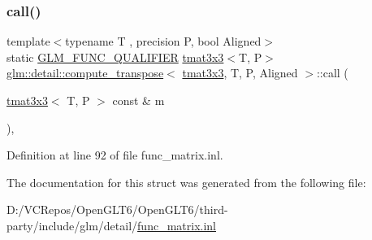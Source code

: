 \subsubsection{\texorpdfstring{call()}{call()}}
{\footnotesize\ttfamily template$<$typename T , precision P, bool Aligned$>$ \\
static \mbox{\hyperlink{setup_8hpp_a33fdea6f91c5f834105f7415e2a64407}{G\+L\+M\+\_\+\+F\+U\+N\+C\+\_\+\+Q\+U\+A\+L\+I\+F\+I\+ER}} \mbox{\hyperlink{structglm_1_1tmat3x3}{tmat3x3}}$<$T, P$>$ \mbox{\hyperlink{structglm_1_1detail_1_1compute__transpose}{glm\+::detail\+::compute\+\_\+transpose}}$<$ \mbox{\hyperlink{structglm_1_1tmat3x3}{tmat3x3}}, T, P, Aligned $>$\+::call (\begin{DoxyParamCaption}\item[{\mbox{\hyperlink{structglm_1_1tmat3x3}{tmat3x3}}$<$ T, P $>$ const \&}]{m }\end{DoxyParamCaption})\hspace{0.3cm}{\ttfamily [inline]}, {\ttfamily [static]}}



Definition at line 92 of file func\+\_\+matrix.\+inl.



The documentation for this struct was generated from the following file\+:\begin{DoxyCompactItemize}
\item 
D\+:/\+V\+C\+Repos/\+Open\+G\+L\+T6/\+Open\+G\+L\+T6/third-\/party/include/glm/detail/\mbox{\hyperlink{func__matrix_8inl}{func\+\_\+matrix.\+inl}}\end{DoxyCompactItemize}
